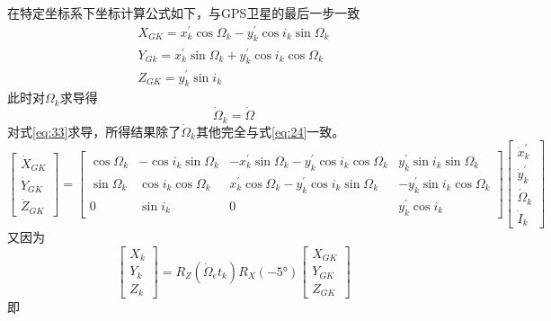 \documentclass{ctexart}
\begin{document}
在特定坐标系下坐标计算公式如下，与GPS卫星的最后一步一致
\begin{equation}
\begin{gathered}
X_{GK}=x_{k}^{\prime} \cos \Omega_{k}-y_{k}^{\prime} \cos i_{k} \sin \Omega_{k} \\
Y_{Gk}=x_{k}^{\prime} \sin \Omega_{k}+y_{k}^{\prime} \cos i_{k} \cos \Omega_{k} \\
Z_{GK}=y_{k}^{\prime} \sin i_{k}
\label{eq:33}
\end{gathered}
\end{equation}
此时对$\Omega_k$求导得
\begin{equation}
\dot{\Omega}_k=\dot{\Omega}
\end{equation}
对式\eqref{eq:33}求导，所得结果除了$\dot{\Omega}_k$其他完全与式\eqref{eq:24}一致。
\begin{equation}
\begin{bmatrix}
\dot{X}_{GK}\\
\dot{Y}_{GK}\\
\dot{Z}_{GK}
\end{bmatrix}=\begin{bmatrix}
\cos\Omega_k&-\cos i_k\sin\Omega_k&-x_k^{\prime}\sin\Omega_k-y_k^{\prime}\cos i_k\cos\Omega_k&y_k^{\prime}\sin i_k\sin\Omega_k\\
\sin\Omega_k&\cos i_k\cos\Omega_k&x_k^{\prime}\cos\Omega_k-y_k^{\prime}\cos i_k\sin\Omega_k&-y_k^{\prime}\sin i_k\cos\Omega_k\\
0&\sin i_k&0&y_k^{\prime}\cos i_k
\end{bmatrix}\begin{bmatrix}
\dot{x}_k^{\prime}\\
\dot{y}_k^{\prime}\\
\dot{\Omega}_k\\
\dot{I}_k
\end{bmatrix}
\end{equation}
又因为
\begin{equation}
\begin{bmatrix}
X_k\\
Y_k\\
Z_k
\end{bmatrix}=R_Z(\dot{\Omega}_et_k)R_X(-5°)\begin{bmatrix}
X_{GK}\\
Y_{GK}\\
Z_{GK}
\end{bmatrix}
\end{equation}
即
\end{document}
